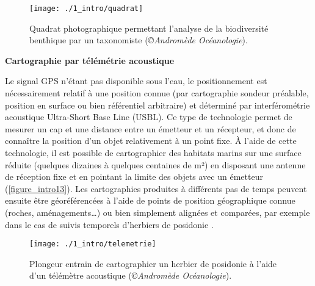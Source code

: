 \begin{figure}[H]
	\begin{center}
	\texttt{[image: ./1\_intro/quadrat]}
		\caption[Quadrat photographique permettant l’analyse de la biodiversité benthique par un taxonomiste]{Quadrat photographique permettant l’analyse de la biodiversité benthique par un taxonomiste (\textit{©Andromède Océanologie}).}
	\label{figure_intro12}
\end{center}
\end{figure}

\noindent\textbf{Cartographie par télémétrie acoustique}

Le signal GPS n’étant pas disponible sous l’eau, le positionnement est nécessairement relatif à une position connue (par cartographie sondeur préalable, position en surface ou bien référentiel arbitraire) et déterminé par interférométrie acoustique Ultra-Short Base Line (USBL). Ce type de technologie permet de mesurer un cap et une distance entre un émetteur et un récepteur, et donc de connaître la position d’un objet relativement à un point fixe. À l’aide de cette technologie, il est possible de cartographier des habitats marins sur une surface réduite (quelques dizaines à quelques centaines de m²) en disposant une antenne de réception fixe et en pointant la limite des objets avec un émetteur (\autoref{figure_intro13}). Les cartographies produites à différents pas de temps peuvent ensuite être géoréférencées à l’aide de points de position géographique connue (roches, aménagements…) ou bien simplement alignées et comparées, par exemple dans le cas de suivis temporels d’herbiers de posidonie \citep{descamp_underwater_2005, descamp_fast_2011}.

\begin{figure}[H]
	\begin{center}
	\texttt{[image: ./1\_intro/telemetrie]}
		\caption[Plongeur entrain de cartographier un herbier de posidonie à l’aide d’un télémètre acoustique]{Plongeur entrain de cartographier un herbier de posidonie à l’aide d’un télémètre acoustique (\textit{©Andromède Océanologie}).}
	\label{figure_intro13}
\end{center}
\end{figure}

